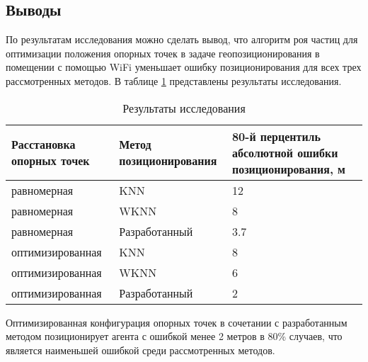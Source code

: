 \subsection{Выводы}


По результатам исследования можно сделать вывод, что алгоритм роя частиц для оптимизации положения опорных точек в задаче геопозиционирования в помещении с помощью WiFi уменьшает ошибку позиционирования для всех трех рассмотренных методов. В таблице \ref{tab:finres} представлены результаты исследования.

\begin{table}[H]
    \centering
    \caption{Результаты исследования}
    \label{tab:finres}
    \begin{tabular}{|m{5cm}|m{5cm}|m{5cm}|}
        \hline
        Расстановка опорных точек & Метод позиционирования & 80-й перцентиль абсолютной ошибки позиционирования, м \\
        \hline
        равномерная & KNN & 12 \\
        \hline
        равномерная & WKNN & 8 \\
        \hline
        равномерная & Разработанный & 3.7 \\
        \hline
        оптимизированная & KNN & 8 \\
        \hline
        оптимизированная & WKNN & 6 \\
        \hline
        оптимизированная & Разработанный & 2 \\
        \hline
    \end{tabular}
\end{table}

Оптимизированная конфигурация опорных точек в сочетании с разработанным методом позиционирует агента с ошибкой менее 2 метров в 80\% случаев, что является наименьшей ошибкой среди рассмотренных методов.
